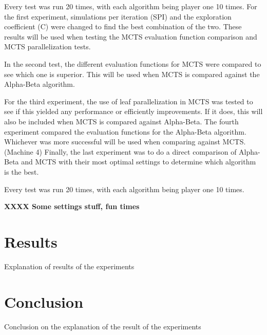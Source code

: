 \documentclass{ba-kecs}
\begin{document}
Every test was run 20 times, with each algorithm being player one 10 times. For the first experiment, simulations per iteration (SPI) and the exploration coefficient (C) were changed to find the best combination of the two. These results will be used when testing the MCTS evaluation function comparison and MCTS parallelization tests. 

In the second test, the different evaluation functions for MCTS were compared to see which one is superior. This will be used when MCTS is compared against the Alpha-Beta algorithm. 

For the third experiment, the use of leaf parallelization in MCTS was tested to see if this yielded any performance or efficiently improvements. If it does, this will also be included when MCTS is compared against Alpha-Beta. The fourth experiment compared the evaluation functions for the Alpha-Beta algorithm. Whichever was more successful will be used when comparing against MCTS. (Machine 4) Finally, the last experiment was to do a direct comparison of Alpha-Beta and MCTS with their most optimal settings to determine which algorithm is the best.

Every test was run 20 times, with each algorithm being player one 10 times. 

\textbf{ XXXX Some settings stuff, fun times}
\section{Results}
Explanation of results of the experiments
\section{Conclusion}
Conclusion on the explanation of the result of the experiments


\end{document}
